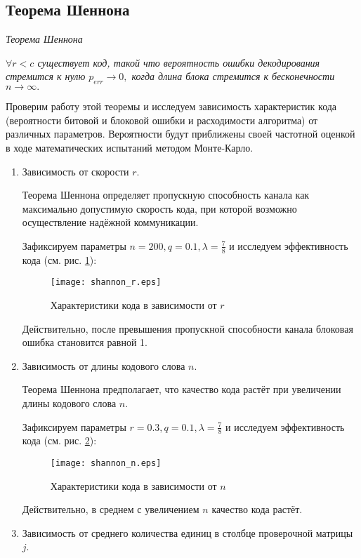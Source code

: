 \documentclass[12pt,a4paper,oneside,fleqn,leqno]{article}
\begin{document}
		\subsection{Теорема Шеннона}
		\emph{Теорема Шеннона}\par
			\emph{$\forall r < c$ существует код, такой что вероятность ошибки декодирования стремится к нулю $p_{err} \rightarrow 0,$ когда длина блока стремится к бесконечности $n \rightarrow \infty.$}\par
		Проверим работу этой теоремы и исследуем зависимость характеристик кода (вероятности битовой и блоковой ошибки и расходимости алгоритма) от различных параметров. Вероятности будут приближены своей частотной оценкой в ходе математических испытаний методом Монте-Карло.
		\begin{enumerate}
			\item Зависимость от скорости $r$.\par
			Теорема Шеннона определяет пропускную способность канала как максимально допустимую скорость кода, при которой возможно осуществление надёжной коммуникации.\par
			Зафиксируем параметры $n = 200, q = 0.1, \lambda = \frac{7}{8}$ и исследуем эффективность кода (см. рис. \ref{fig:shannon_r}):
			\begin{figure}[H]
				\centering
				\captionsetup{justification=centering}
				\texttt{[image: shannon\_r.eps]}
				\caption{Характеристики кода в зависимости от $r$}
				\label{fig:shannon_r}
			\end{figure}\par
			Действительно, после превышения пропускной способности канала блоковая ошибка становится равной 1.
			\item Зависимость от длины кодового слова $n$.\par
			Теорема Шеннона предполагает, что качество кода растёт при увеличении длины кодового слова $n.$\par
			Зафиксируем параметры $r = 0.3, q = 0.1, \lambda = \frac{7}{8}$ и исследуем эффективность кода (см. рис. \ref{fig:shannon_n}):
			\begin{figure}[H]
				\centering
				\captionsetup{justification=centering}
				\texttt{[image: shannon\_n.eps]}
				\caption{Характеристики кода в зависимости от $n$}
				\label{fig:shannon_n}
			\end{figure}\par
			Действительно, в среднем с увеличением $n$ качество кода растёт.
			\item Зависимость от среднего количества единиц в столбце проверочной матрицы $j$.\par

\end{enumerate}
\end{document}

